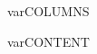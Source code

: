 \documentclass{article}
\date{\today}
\begin{document}
\maketitle

\begin{multicols}{var{COLUMNS}}{

var{CONTENT}

}
\end{multicols}
\end{document}
